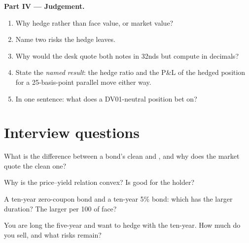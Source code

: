 \begin{problem}
\medskip\noindent\textbf{Part IV --- Judgement.}
\begin{enumerate}[resume]
\item Why hedge  rather than face value, or market value?
\item Name two risks the hedge leaves.
\item Why would the desk quote both notes in 32nds but compute in decimals?
\item State the \emph{named result}: the hedge ratio and the P\&L of the
hedged position for a 25-basis-point parallel move either way.
\item In one sentence: what does a DV01-neutral position bet on?
\end{enumerate}
\end{problem}

\section{Interview questions}

\begin{interviewq}\label{iq:m2:government-bonds:1}
What is the difference between a bond's clean and , and why does
the market quote the clean one?
\end{interviewq}

\begin{interviewq}\label{iq:m2:government-bonds:2}
Why is the price--yield relation convex? Is  good for the holder?
\end{interviewq}

\begin{interviewq}\label{iq:m2:government-bonds:3}
A ten-year zero-coupon bond and a ten-year 5\%  bond: which has the
larger duration? The larger  per 100 of face?
\end{interviewq}

\begin{interviewq}\label{iq:m2:government-bonds:4}
You are long the five-year and want to hedge with the ten-year. How much do
you sell, and what risks remain?
\end{interviewq}

